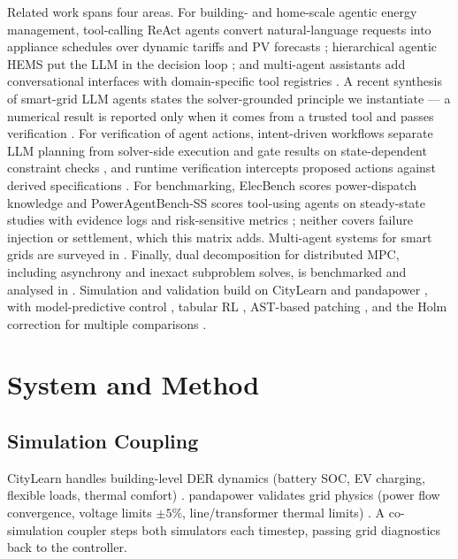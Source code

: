 \documentclass[11pt,a4paper]{article}
\begin{document}
Related work spans four areas. For building- and home-scale agentic energy management, tool-calling ReAct agents convert natural-language requests into appliance schedules over dynamic tariffs and PV forecasts \cite{jonah2026agentic}; hierarchical agentic HEMS put the LLM in the decision loop \cite{elmakroum2026agentic}; and multi-agent assistants add conversational interfaces with domain-specific tool registries \cite{jung2026hema}. A recent synthesis of smart-grid LLM agents states the solver-grounded principle we instantiate --- a numerical result is reported only when it comes from a trusted tool and passes verification \cite{rojas2026smartgridllm}. For verification of agent actions, intent-driven workflows separate LLM planning from solver-side execution and gate results on state-dependent constraint checks \cite{mao2026intent}, and runtime verification intercepts proposed actions against derived specifications \cite{batole2026refineact}. For benchmarking, ElecBench scores power-dispatch knowledge \cite{zhou2025elecbench} and PowerAgentBench-SS scores tool-using agents on steady-state studies with evidence logs and risk-sensitive metrics \cite{mylonas2026poweragentbench}; neither covers failure injection or settlement, which this matrix adds. Multi-agent systems for smart grids are surveyed in \cite{izmirlioglu2024mas}. Finally, dual decomposition for distributed MPC, including asynchrony and inexact subproblem solves, is benchmarked and analysed in \cite{yfantis2024dual, su2021dual}. Simulation and validation build on CityLearn \cite{citylearn2021} and pandapower \cite{pandapower2018}, with model-predictive control \cite{mpc2020}, tabular RL \cite{acmenergy2022}, AST-based patching \cite{ast2020}, and the Holm correction for multiple comparisons \cite{holm1979}.

\section{System and Method}
\label{sec:method}

\subsection{Simulation Coupling}
CityLearn handles building-level DER dynamics (battery SOC, EV charging, flexible loads, thermal comfort) \cite{citylearn2021}. pandapower validates grid physics (power flow convergence, voltage limits $\pm 5\%$, line/transformer thermal limits) \cite{pandapower2018}. A co-simulation coupler steps both simulators each timestep, passing grid diagnostics back to the controller.
\end{document}
